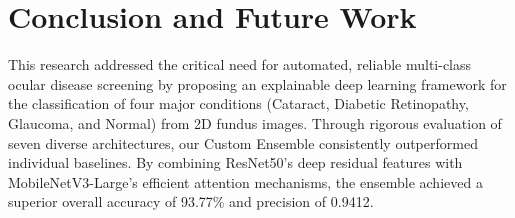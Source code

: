 \documentclass[conference]{IEEEtran}
\begin{document}
{{\section{Conclusion and Future Work}

This research addressed the critical need for automated, reliable multi-class ocular disease screening by proposing an explainable deep learning framework for the classification of four major conditions (Cataract, Diabetic Retinopathy, Glaucoma, and Normal) from 2D fundus images. Through rigorous evaluation of seven diverse architectures, our Custom Ensemble consistently outperformed individual baselines. By combining ResNet50's deep residual features with MobileNetV3-Large's efficient attention mechanisms, the ensemble achieved a superior overall accuracy of 93.77\% and precision of 0.9412. 

}}
\end{document}
